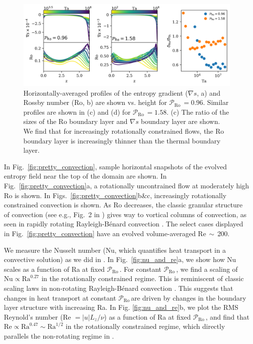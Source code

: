 \documentclass[twocolumn, amsmath, amsfonts, amssymb]{aastex62}
\newcommand{\grad}{\ensuremath{\nabla}}
\newcommand{\RB}{Rayleigh-B\'{e}nard }
\newcommand{\pro}{\ensuremath{\mathcal{P}_{\text{Ro}}\,}}
\begin{document}
\begin{figure}[ht!]
\includegraphics[width=\textwidth]{./figs/boundary_layers.png}
\caption{Horizontally-averaged profiles of the entropy gradient ($\grad s$, a)
and Rossby number (Ro, b) are shown vs. height for $\pro = 0.96$. 
Similar profiles are shown in (c) and (d) for $\pro = 1.58$. 
(c) The ratio of the sizes of the Ro boundary layer and $\grad s$ boundary layer are
shown. We find that for increasingly rotationally constrained flows, the Ro boundary layer
is increasingly thinner than the thermal boundary layer.
\label{fig:profiles_and_bls} }
\end{figure}





In Fig.~\ref{fig:pretty_convection}, sample horizontal snapshots of the evolved entropy field
near the top of the domain are shown. 
In Fig.~\ref{fig:pretty_convection}a, a rotationally uncontrained flow at moderately high
Ro is shown. In Figs.~\ref{fig:pretty_convection}b\&c, increasingly rotationally constrained
convection is shown.
As Ro decreases, the
classic granular structure of convection (see e.g., Fig.~2 in \AB) gives way to vortical
columns of convection, as seen in rapidly rotating \RB convection \citep{stellmach&all2014}.
The select cases displayed in Fig.~\ref{fig:pretty_convection} have an evolved volume-averaged
Re$\,\sim\,$200.




We measure the Nusselt number (Nu, which quantifies heat transport in a convective
solution) as we did in \AB.
In Fig.~\ref{fig:nu_and_re}a, we show how Nu scales as a function
of Ra at fixed \pro. For constant \pro,
we find a scaling of $\text{Nu} \propto \text{Ra}^{0.27}$ in
the rotationally constrained regime. This is reminiscent of
classic scaling laws in non-rotating \RB convection \citep{ahlers&all2009}.
This suggests that changes in heat transport at constant \pro are driven by
changes in the boundary layer structure with increasing Ra.
In Fig. \ref{fig:nu_and_re}b, we plot the RMS Reynold's
number (Re $= |u| L_z / \nu$) as a function of Ra at fixed \pro, and find that 
$\text{Re} \propto \text{Ra}^{0.47} \sim \text{Ra}^{1/2}$ in the rotationally constrained regime,
which directly parallels the non-rotating regime in \AB.
\end{document}
